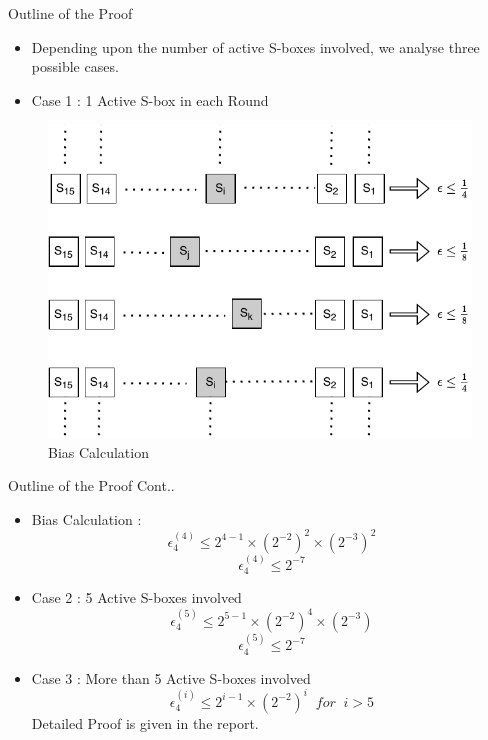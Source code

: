 \begin{frame}{Outline of the Proof}
\begin{itemize}
    \item Depending upon the number of active S-boxes involved, we analyse three possible cases.
    \item Case 1 : 1 Active S-box in each Round 
\end{itemize}
\begin{figure}[H]
        \centering
        \includegraphics[width=\linewidth]{LC1.pdf}
        \endminipage
        \caption{Bias Calculation}
    \end{figure}
    
\end{frame}

\begin{frame}{Outline of the Proof Cont..}
\begin{itemize}
    \item Bias Calculation : 
    \begin{equation*}
        \epsilon_4^{(4)} \leq 2^{4-1} \times (2^{-2})^2 \times (2^{-3})^2
    \end{equation*}
    \begin{equation*}
        \epsilon_4^{(4)} \leq 2^{-7} 
    \end{equation*}
    \item Case 2 : 5 Active S-boxes involved
    \begin{equation*}
        \epsilon_4^{(5)} \leq 2^{5-1} \times (2^{-2})^4 \times (2^{-3})
    \end{equation*}
    \begin{equation*}
        \epsilon_4^{(5)} \leq 2^{-7} 
    \end{equation*}
    \item Case 3 : More than 5 Active S-boxes involved
    \begin{equation*}
        \epsilon_4^{(i)} \leq 2^{i-1} \times (2^{-2})^i \;\; for \;\; i > 5
    \end{equation*}
    Detailed Proof is given in the report.
\end{itemize}
\end{frame}

